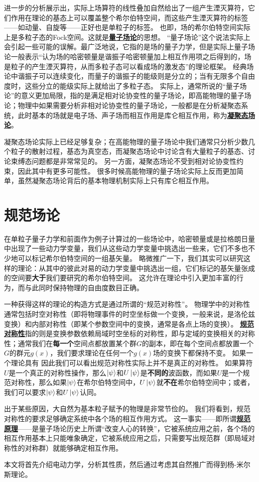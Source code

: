 \documentclass[hyperref, UTF8, a4paper]{ctexbook}
\newcommand{\concept}[1]{\underline{\textbf{#1}}}
\renewcommand{\emph}{\textbf}
\begin{document}
进一步的分析展示出，实际上场算符的线性叠加自然给出了一组产生湮灭算符，它们作用在理论的基态上可以覆盖整个希尔伯特空间，而这些产生湮灭算符的标签——如动量、自旋等——正好也是单粒子的标签。
也即，场的希尔伯特空间实际上是多粒子态的Fock空间。这就是\concept{量子场论}的思想。
“量子场论”这个说法实际上会引起一些可能的误解。最广泛地说，它指的是场的量子力学，但是实际上量子场论一般表示“认为场的哈密顿量是谐振子哈密顿量加上相互作用项之后得到的，场是粒子的产生湮灭算符，从而多粒子态可以看成场的激发态”的理论框架。
经典场论中谐振子可以连续变化，而量子的谐振子的能级则是分立的；当有无限多个自由度时，这些分立的能级实际上就给出了多粒子态。
实际上，通常所说的“量子场论”的意义更加局限，指的是满足相对论协变性的量子场论，即高能物理的量子场论；物理中如果需要分析非相对论协变性的量子场论，一般都是在分析凝聚态系统，此时基本的场就是电子场、声子场而相互作用是库仑相互作用，称为\concept{凝聚态场论}。

凝聚态场论实际上已经足够复杂；在高能物理的量子场论中我们通常只分析少数几个粒子的散射过程，基态为真空态，而凝聚态场论中讨论含有大量粒子的基态、讨论束缚态问题都是非常常见的。
另一方面，凝聚态场论不受到相对论协变性约束，因此其中有更多可能性。
很多时候高能物理的量子场论实际上反而更加简单，虽然凝聚态场论背后的基本物理机制实际上只有库仑相互作用。







\part{规范场论}

在单粒子量子力学和前面作为例子计算过的一些场论中，哈密顿量或是拉格朗日量中出现了一些动力学变量，我们从这些动力学变量中挑选出一些来，它们不多也不少地可以标记希尔伯特空间的一组基矢量。
略微推广一下，我们其实可以研究这样的理论：从其中的彼此对易的动力学变量中挑选出一组，它们标记的基矢量张成的空间要\emph{大于}我们要研究的希尔伯特空间。
这允许在理论中引入更加丰富的行为，而与此同时保持物理的自由度数目正确。

一种获得这样的理论的构造方式是通过所谓的“规范对称性”。
物理学中的对称性通常包括时空对称性（即将物理事件的时空坐标做一个变换，一般来说，是洛伦兹变换）和内部对称性（即某个参数空间中的变换，通常是各点上场的变换）。
\concept{规范对称性}指的则是变换参数依赖局域时空坐标的对称性，即与定域的变换相关的对称性；通常我们在\emph{每一个}空间点都放置某个群$G$的副本，即在每个空间点都放置一个$G$的群元$g(x)$，我们要求理论在任何一个$g(x)$场的变换下都保持不变。
如果一个理论具有
因此我们可以看出规范对称性实际上并不是真正的对称性。
如果算符$U$是一个真正的对称性操作，那么$\ket{\psi}$和$U \ket{\psi}$是\emph{不同的}波函数，而如果$U$是一个规范对称性，那么如果$\ket{\psi}$在希尔伯特空间中，$U \ket{\psi}$就\emph{不在}希尔伯特空间中；或者，我们可以要求$\ket{\psi}$和$U \ket{\psi}$认同。

出于某些原因，大自然为基本粒子赋予的物理是非常节俭的。
我们将看到，规范对称性的要求足够确定系统中各个场的相互作用方式。
这一事实——即所谓\concept{规范原理}——是量子场论历史上所谓“改变人心的转换”，它被系统应用之前，各个场的相互作用基本上只能唯象确定，它被系统应用之后，只需要写出规范群（即局域对称性的对称群）就能够确定相互作用。

本文将首先介绍电动力学，分析其性质，然后通过考虑其自然推广而得到杨-米尔斯理论。








\end{document}
